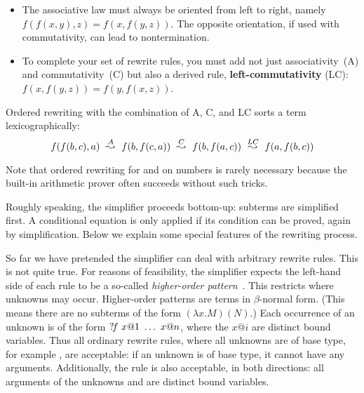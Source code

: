 \begin{isabellebody}
\begin{isamarkuptext}
\begin{itemize}
\item The associative law must always be oriented from left to right,
  namely $f(f(x,y),z) = f(x,f(y,z))$.  The opposite orientation, if
  used with commutativity, can lead to nontermination.

\item To complete your set of rewrite rules, you must add not just
  associativity~(A) and commutativity~(C) but also a derived rule, {\bf
    left-com\-mut\-ativ\-ity} (LC): $f(x,f(y,z)) = f(y,f(x,z))$.
\end{itemize}
Ordered rewriting with the combination of A, C, and LC sorts a term
lexicographically:
\[\def\maps#1{~\stackrel{#1}{\leadsto}~}
 f(f(b,c),a) \maps{A} f(b,f(c,a)) \maps{C} f(b,f(a,c)) \maps{LC} f(a,f(b,c)) \]

Note that ordered rewriting for \isa{{\isacharplus}} and \isa{{\isacharasterisk}} on numbers is rarely
necessary because the built-in arithmetic prover often succeeds without
such tricks.%
\end{isamarkuptext}%
\isamarkuptrue%
%
\isamarkuptrue%
%
\begin{isamarkuptext}%
\label{sec:SimpHow}
Roughly speaking, the simplifier proceeds bottom-up: subterms are simplified
first.  A conditional equation is only applied if its condition can be
proved, again by simplification.  Below we explain some special features of
the rewriting process.%
\end{isamarkuptext}%
\isamarkuptrue%
%
\isamarkuptrue%
%
\begin{isamarkuptext}%
So far we have pretended the simplifier can deal with arbitrary
rewrite rules. This is not quite true.  For reasons of feasibility,
the simplifier expects the
left-hand side of each rule to be a so-called \emph{higher-order
pattern}~\cite{nipkow-patterns}. 
This restricts where
unknowns may occur.  Higher-order patterns are terms in $\beta$-normal
form.  (This means there are no subterms of the form $(\lambda x. M)(N)$.)  
Each occurrence of an unknown is of the form
${?\!f}~x@1~\dots~x@n$, where the $x@i$ are distinct bound
variables. Thus all ordinary rewrite rules, where all unknowns are
of base type, for example , are acceptable: if an unknown is
of base type, it cannot have any arguments. Additionally, the rule
 is also acceptable, in
both directions: all arguments of the unknowns  and
 are distinct bound variables.


\end{isamarkuptext}
\end{isabellebody}
